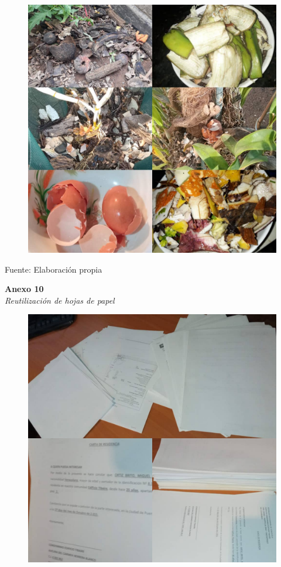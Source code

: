 \begin{figure}[!ht]
    \centering
    \includegraphics[width=15cm]{Media/Fotos/Foto 5 Compost.jpeg}
    \label{fig:anexo10}
\end{figure}

\setlength{\parindent}{0ex}

Fuente: Elaboración propia

\newpage

\textbf{Anexo 10} \\
\textit{Reutilización de hojas de papel}

\begin{figure}[!ht]
    \centering
    \includegraphics[width=15cm]{Media/Fotos/Foto 8 papel.jpeg}
    \label{fig:anexo11}
\end{figure}

